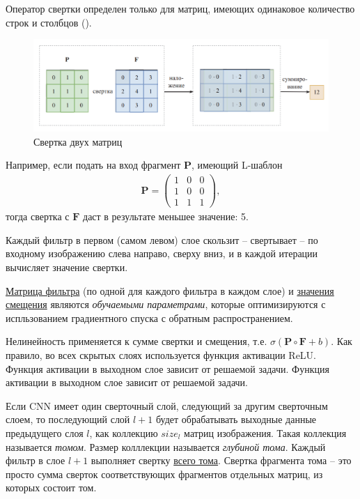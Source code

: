 \documentclass[%
	11pt,
	a4paper,
	utf8,
		]{article}
\begin{document}
Оператор свертки определен только для матриц, имеющих одинаковое количество строк и столбцов ().

\begin{figure}[h]
	\centering
	\includegraphics[scale=0.6]{figures/conv.png}
	\caption{ Свертка двух матриц }\label{fig:conv}
\end{figure}

Например, если подать на вход фрагмент $ \mathbf{P} $, имеющий L-шаблон
\begin{align*}
	\mathbf{P} = 
	\begin{pmatrix}
		1 & 0 & 0 \\
		1 & 0 & 0 \\
		1 & 1 & 1
	\end{pmatrix},
\end{align*}
тогда свертка с $ \mathbf{F} $ даст в результате меньшее значение: 5.


Каждый фильтр в первом (самом левом) слое скользит -- свертывает -- по входному изображению слева направо, сверху вниз, и в каждой итерации вычисляет значение свертки.

\underline{Матрица фильтра} (по одной для каждого фильтра в каждом слое) и \underline{значения смещения} являются \emph{обучаемыми параметрами}, которые оптимизируются с испльзованием градиентного спуска с обратным распространением.

Нелинейность применяется к сумме свертки и смещения, т.е. $ \sigma (\mathbf{P} \circ \mathbf{F} + b) $. Как правило, во всех скрытых слоях используется функция активации ReLU. Функция активации в выходном слое зависит от решаемой задачи. Функция активации в выходном слое зависит от решаемой задачи.

Если CNN имеет один сверточный слой, следующий за другим сверточным слоем, то последующий слой $ l + 1 $ будет обрабатывать выходные данные предыдущего слоя $ l $, как коллекцию $ size_l $ матриц изображения. Такая коллекция называется \emph{томом}. Размер колллекции называется \emph{глубиной тома}. Каждый фильтр в слое $ l + 1 $ выполняет свертку \underline{всего тома}. Свертка фрагмента тома -- это просто сумма сверток соответствующих фрагментов отдельных матриц, из которых состоит том.
\end{document}
